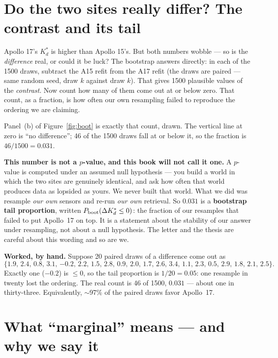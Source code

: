 \documentclass[11pt]{report}
\begin{document}
\section{Do the two sites really differ? The contrast and its
tail}\label{sec:pzero}

\begin{plain}
Apollo 17's $K_d^{*}$ is higher than Apollo 15's. But both numbers wobble ---
so is the \emph{difference} real, or could it be luck? The bootstrap answers
directly: in each of the 1500 draws, subtract the A15 refit from the A17
refit (the draws are paired --- same random seed, draw $k$ against draw $k$).
That gives 1500 plausible values of the \emph{contrast}. Now count how many
of them come out at or below zero. That count, as a fraction, is how often
our own resampling failed to reproduce the ordering we are claiming.
\end{plain}

Panel~(b) of Figure~\ref{fig:boot} is exactly that count, drawn. The vertical
line at zero is ``no difference''; 46 of the 1500 draws fall at or below it,
so the fraction is $46/1500 = 0.031$.

\begin{warn}
\textbf{This number is not a $p$-value, and this book will not call it one.}
A $p$-value is computed under an assumed null hypothesis --- you build a world
in which the two sites are genuinely identical, and ask how often that world
produces data as lopsided as yours. We never built that world. What we did was
resample \emph{our own} sensors and re-run \emph{our own} retrieval. So
$0.031$ is a \textbf{bootstrap tail proportion}, written
$P_{\rm boot}(\Delta K_d^{*}\le 0)$: the fraction of our resamples that failed
to put Apollo~17 on top. It is a statement about the stability of our answer
under resampling, not about a null hypothesis. The letter and the thesis are
careful about this wording and so are we.
\end{warn}

\noindent\textbf{Worked, by hand.} Suppose 20 paired draws of a difference
come out as
\[
\{1.9,\, 2.4,\, 0.8,\, 3.1,\, {-0.2},\, 2.2,\, 1.5,\, 2.8,\, 0.9,\, 2.0,\,
1.7,\, 2.6,\, 3.4,\, 1.1,\, 2.3,\, 0.5,\, 2.9,\, 1.8,\, 2.1,\, 2.5\}.
\]
Exactly one ($-0.2$) is $\leq 0$, so the tail proportion is $1/20 = 0.05$:
one resample in twenty lost the ordering. The real count is 46 of 1500,
$0.031$ --- about one in thirty-three. Equivalently, $\sim$97\% of the paired
draws favor Apollo~17.

\section{What ``marginal'' means --- and why we say it}\label{sec:marginalzero}
\end{document}
